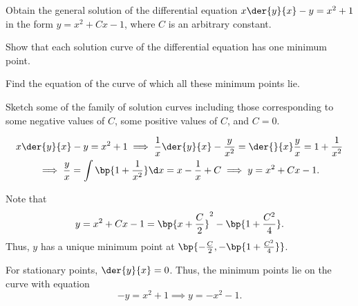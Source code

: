 \begin{problem}
    Obtain the general solution of the differential equation $x \der{y}{x} - y = x^2 + 1$ in the form $y = x^2 + Cx - 1$, where $C$ is an arbitrary constant.

    Show that each solution curve of the differential equation has one minimum point.

    Find the equation of the curve of which all these minimum points lie.

    Sketch some of the family of solution curves including those corresponding to some negative values of $C$, some positive values of $C$, and $C = 0$.
\end{problem}
\begin{solution}
    \begin{gather*}
        x \der{y}{x} - y = x^2 + 1 \implies \frac1x \der{y}{x} - \frac{y}{x^2} = \der{}{x} \frac{y}{x} = 1 + \frac1{x^2}\\
        \implies \frac{y}{x} = \int \bp{1 + \frac1{x^2}} \d x = x - \frac1x + C \implies y = x^2 + Cx - 1.
    \end{gather*}

    Note that \[y = x^2 + Cx - 1 = \bp{x + \frac{C}{2}}^2 - \bp{1 + \frac{C^2}4}.\] Thus, $y$ has a unique minimum point at $\bp{-\frac{C}2, -\bp{1 + \frac{C^2}4}}$.

    For stationary points, $\der{y}{x} = 0$. Thus, the minimum points lie on the curve with equation \[-y = x^2 + 1 \implies y = -x^2 - 1.\]

    \begin{center}
    \end{center}
\end{solution}

